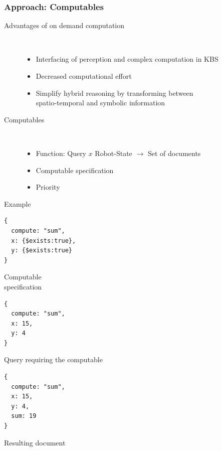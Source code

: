 \begin{frame}[fragile]
  \frametitle{Approach: Computables}
  \begin{description}
  \item[Advantages of on demand computation]%
                \hfill \\
    \begin{itemize}
    \item Interfacing of perception and complex computation in KBS %
    \item Decreased computational effort %
    \item Simplify hybrid reasoning by transforming between\\ spatio-temporal and symbolic information
    \end{itemize}
  \item[Computables]%
                \hfill \\
    \begin{itemize}
    \item Function: Query $x$ Robot-State $\rightarrow$ Set of documents
    \item Computable specification
    \item Priority %
    \end{itemize}
  \item[Example]%
  \end{description}

\begin{minipage}[b]{.27\textwidth}
\begin{lstlisting}[style=ReallySmallJSON,
  framexleftmargin=5pt, xleftmargin=0pt,
 morekeywords={}, numbers=none]
{
  compute: "sum",
  x: {$exists:true},
  y: {$exists:true}
}
\end{lstlisting}
Computable\\specification
\end{minipage}%
\hfill
\begin{minipage}[b]{.25\textwidth}
\begin{lstlisting}[style=ReallySmallJSON,
  framexleftmargin=5pt, xleftmargin=0pt,
 morekeywords={}, numbers=none]
{
  compute: "sum",
  x: 15,
  y: 4
}
\end{lstlisting}
Query requiring the computable
\end{minipage}%
\hfill
\begin{minipage}[b]{.25\textwidth}
\begin{lstlisting}[style=ReallySmallJSON,
  framexleftmargin=5pt, xleftmargin=0pt,
 morekeywords={}, numbers=none]
{
  compute: "sum",
  x: 15,
  y: 4,
  sum: 19
}
\end{lstlisting}
  \vspace{-0.1cm}
Resulting document
\end{minipage}%
\end{frame}

